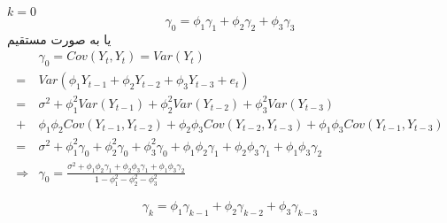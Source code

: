 \documentclass{article}
\begin{document}
$k = 0$
\[ \gamma_0 = \phi_1 \gamma_1 + \phi_2 \gamma_2 + \phi_3 \gamma_3 \] 
یا به صورت مستقیم
\begin{align*}
    & \gamma_0 = Cov(Y_t, Y_t) = Var(Y_t) \\ 
    = & Var(\phi_1 Y_{t-1} + \phi_2 Y_{t-2} + \phi_3 Y_{t-3} + e_t) \\
    = & \sigma^2 + \phi_1^2 Var(Y_{t-1}) + \phi_2^2 Var(Y_{t-2}) + \phi_3^2 Var(Y_{t-3}) \\
    + & \phi_1\phi_2Cov(Y_{t-1}, Y_{t-2}) + \phi_2\phi_3Cov(Y_{t-2}, Y_{t-3}) + \phi_1\phi_3Cov(Y_{t-1}, Y_{t-3}) \\ 
    = & \sigma^2 + \phi_1^2\gamma_0 + \phi_2^2\gamma_0 + \phi_3^2\gamma_0 + \phi_1\phi_2\gamma_1 + \phi_2\phi_3\gamma_1 + \phi_1\phi_3\gamma_2 \\
    \Rightarrow & \gamma_0 = \frac{\sigma^2 + \phi_1\phi_2\gamma_1 + \phi_2\phi_3\gamma_1 + \phi_1\phi_3\gamma_2}{1 - \phi_1^2 - \phi_2^2 - \phi_3^2 }
\end{align*}


\[ \gamma_k = \phi_1\gamma_{k-1} + \phi_2\gamma_{k-2} + \phi_3\gamma_{k-3} \]



\end{document}
